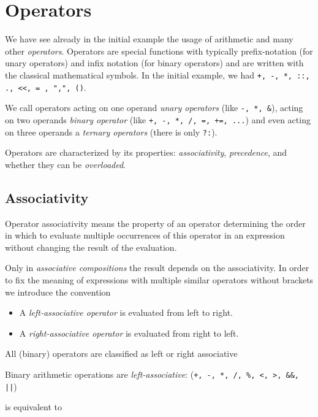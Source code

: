 \section{Operators\label{sec:operator}}
We have see already in the initial example the usage of arithmetic and many other \emph{operators}. Operators are special functions with typically prefix-notation (for unary operators) and infix notation (for binary operators) and are written with the classical mathematical symbols. In the initial example, we had \texttt{+, -, *, ::, ., <<, = , ",", ()}.

\begin{defn}
  We call operators acting on one operand \emph{unary operators} (like \texttt{-, *, \&}), acting on two operands \emph{binary operator} (like \texttt{+, -, *, /, =, +=, ...}) and even acting on three operands a \emph{ternary operators} (there is only \texttt{?:}).
\end{defn}

Operators are characterized by its properties: \emph{associativity}, \emph{precedence}, and whether they can be \emph{overloaded}.

\subsection{Associativity\label{sec:operator-associativity}}
\begin{defn}
  Operator associativity means the property of an operator determining the order in which to evaluate multiple occurrences of this operator in an expression without changing the result of the evaluation.
\end{defn}

Only in \emph{associative compositions} the result depends on the associativity. In order to fix the meaning of expressions with multiple
similar operators without brackets we introduce the convention
\begin{itemize}
  \item A \emph{left-associative operator} is evaluated from left to right.
  \item A \emph{right-associative operator} is evaluated from right to left.
\end{itemize}

All (binary) operators are classified as left or right associative

\begin{example}
  Binary arithmetic operations are \emph{left-associative}: (\texttt{+, -, *, /, \%, <, >, \&\&, ||})

   is equivalent to 
\end{example}

